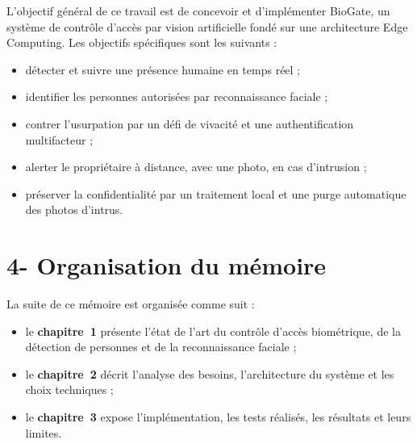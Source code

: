 L'objectif général de ce travail est de concevoir et d'implémenter BioGate, un système de contrôle d'accès par vision artificielle fondé sur une architecture Edge Computing. Les objectifs spécifiques sont les suivants :
\begin{itemize}
  \item détecter et suivre une présence humaine en temps réel ;
  \item identifier les personnes autorisées par reconnaissance faciale ;
  \item contrer l'usurpation par un défi de vivacité et une authentification multifacteur ;
  \item alerter le propriétaire à distance, avec une photo, en cas d'intrusion ;
  \item préserver la confidentialité par un traitement local et une purge automatique des photos d'intrus.
\end{itemize}

\section*{4- Organisation du mémoire}

La suite de ce mémoire est organisée comme suit :
\begin{itemize}
  \item le \textbf{chapitre~1} présente l'état de l'art du contrôle d'accès biométrique, de la détection de personnes et de la reconnaissance faciale ;
  \item le \textbf{chapitre~2} décrit l'analyse des besoins, l'architecture du système et les choix techniques ;
  \item le \textbf{chapitre~3} expose l'implémentation, les tests réalisés, les résultats et leurs limites.
\end{itemize}
